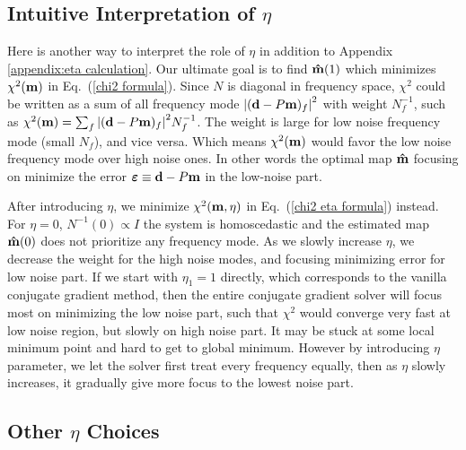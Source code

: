 \documentclass[twocolumn,linenumbers]{aastex631}
\newcommand{\vbd}{\vb{d}}
\newcommand{\vbm}{\vb{m}}
\newcommand{\inv}[1]{#1^{-1}}
\newcommand{\hatm}{\vb{\hat{m}}}
\begin{document}
\subsection{Intuitive Interpretation of $\eta$}\label{intuitive interp}


Here is another way to interpret the role of $\eta$ in addition to Appendix \ref{appendix:eta calculation}.
Our ultimate goal is to find $\hatm(1)$ which minimizes $\chi^2(\vbm)$ in Eq.~(\ref{chi2 formula}).
Since $N$ is diagonal in frequency space,
$\chi^2$ could be written as a sum of all frequency mode
$\qty|(\vbd-P\vbm)_f|^2$ with weight $\inv{N}_f$, such as
$\chi^2(\vbm) = \sum_f \qty|(\vbd-P\vbm)_f|^2 \inv{N}_f$.
The weight is large for low noise frequency mode (small $N_f$), and vice versa.
Which means $\chi^2(\vbm)$ would favor the low noise frequency mode over high
noise ones.
In other words the optimal map $\hatm$ focusing on minimize the error
$\vb*{\varepsilon} \equiv \vbd - P\vbm$ in the low-noise part.

After introducing $\eta$, we minimize
$\chi^2(\vbm,\eta)$ in Eq.~(\ref{chi2 eta formula}) instead.
For $\eta=0$, $N^{-1}(0) \propto I$ the system is homoscedastic and the estimated map $\hatm(0)$
does not prioritize any frequency mode.
As we slowly increase $\eta$, we decrease the weight for the high noise modes,
and focusing minimizing error for low noise part.
If we start with $\eta_1=1$ directly, which corresponds to the vanilla conjugate
gradient method, then the entire conjugate gradient solver
will focus most on minimizing the low noise part, such that $\chi^2$ would
converge very fast at low noise region, but slowly on high noise part.
It may be stuck at some local minimum point and hard to get to global minimum.
However by introducing $\eta$ parameter, we let the solver first treat every
frequency equally,
then as $\eta$ slowly increases, it gradually give more focus to the lowest noise part.



\subsection{Other $\eta$ Choices}
\end{document}
